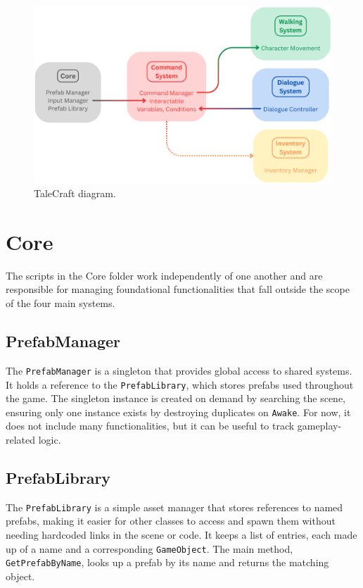 \begin{figure}[H]
\centering
\includegraphics[width=0.85\linewidth]{img/Everything2.png}
\caption{TaleCraft diagram.}
\label{fig:TaleCraft}
\end{figure}

\section{Core}
\label{Core}
The scripts in the Core folder work independently of one another and are responsible for managing foundational functionalities that fall outside the scope of the four main systems. 

\subsection{PrefabManager}
The \verb|PrefabManager| is a singleton that provides global access to shared systems. It holds a reference to the \verb|PrefabLibrary|, which stores prefabs used throughout the game. The singleton instance is created on demand by searching the scene, ensuring only one instance exists by destroying duplicates on \verb|Awake|. For now, it does not include many functionalities, but it can be useful to track gameplay-related logic.

\subsection{PrefabLibrary}
The \verb|PrefabLibrary| is a simple asset manager that stores references to named prefabs, making it easier for other classes to access and spawn them without needing hardcoded links in the scene or code. It keeps a list of entries, each made up of a name and a corresponding \verb|GameObject|. The main method, \verb|GetPrefabByName|, looks up a prefab by its name and returns the matching object.

